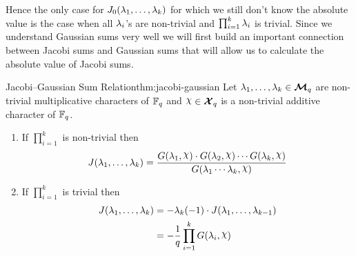Hence the only case for $J_0(\lambda_1,\dots,\lambda_k)$ for which we still don't know the absolute value is the case when all $\lambda_i$'s are non-trivial and $\prod_{i=1}^k\lambda_i$ is trivial. Since we understand Gaussian sums very well we will first build an important connection between Jacobi sums and Gaussian sums that will allow us to calculate the absolute value of Jacobi sums. 
\begin{Theorem}{Jacobi--Gaussian Sum Relation}{thm:jacobi-gaussian}
  Let $\lambda_1,\dots,\lambda_k\in\boldsymbol{\mathcal{M}}_q$ are non-trivial multiplicative characters of $\mathbb{F}_q$ and $\chi\in\Xq$ is a non-trivial additive character of $\mathbb{F}_q$.
  \begin{enumerate}[label=(\roman*)]
    \item If $\prod_{i=1}^k$ is non-trivial then$$J(\lm_1,\dots, \lm_k)=\frac{G(\lm_1,\chi)\cdot G(\lm_2,\chi)\cdots G(\lm_k,\chi)}{G(\lm_1\cdots \lm_k,\chi)}$$
    \item If $\prod_{i=1}^k$ is trivial then \begin{align*}
      J(\lm_1,\dots, \lm_k)& = -\lm_k(-1)\cdot J(\lm_1,\dots, \lm_{k-1})\\ 
      & = -\frac1q \prod_{i=1}^{k}G(\lm_i,\chi)
    \end{align*}
  \end{enumerate}
\end{Theorem}
